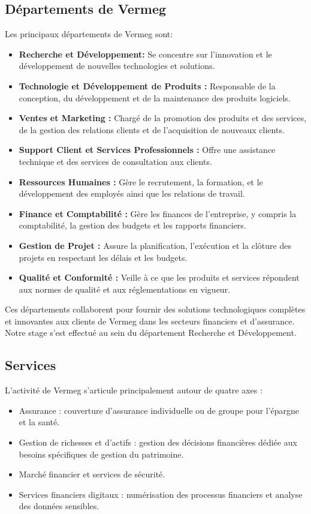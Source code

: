 \subsection{Départements de Vermeg }
Les principaux départements  de Vermeg sont: \cite[]{vermeg}
\begin{itemize}
    \item \textbf{Recherche et Développement:} Se concentre sur l'innovation et le développement de nouvelles technologies et solutions.
    \item \textbf{Technologie et Développement de Produits :} Responsable de la conception, du  développement et de la maintenance des produits logiciels.
    \item \textbf{Ventes et Marketing :} Chargé de la promotion des produits et des services, de la gestion des relations clients et de l'acquisition de nouveaux clients.
    \item \textbf{Support Client et Services Professionnels :} Offre une assistance technique et des services de consultation aux clients.
    \item \textbf{Ressources Humaines :} Gère le recrutement, la formation, et le développement des employés ainsi que les relations de travail.
    \item \textbf{Finance et Comptabilité :} Gère les finances de l'entreprise, y compris la comptabilité, la gestion des budgets et les rapports financiers.
    \item \textbf{Gestion de Projet :} Assure la planification, l'exécution et la clôture des projets en respectant les délais et les budgets.
    \item \textbf{Qualité et Conformité :} Veille à ce que les produits et services répondent aux normes de qualité et aux réglementations en vigueur.
\end{itemize} 
Ces départements collaborent pour fournir des solutions technologiques complètes et innovantes aux clients de Vermeg dans les secteurs financiers et d'assurance. \\ 
Notre stage s'est effectué au sein du département Recherche et Développement.
\subsection{Services }
     L'activité de Vermeg s'articule principalement autour de quatre axes : \cite[]{vermeg}
    \begin{itemize}
        \item Assurance : couverture d’assurance individuelle ou de groupe pour l’épargne et la santé.
        \item Gestion de richesses et d’actifs : gestion des décisions financières dédiée aux besoins spécifiques de gestion du patrimoine.
        \item Marché financier et services de sécurité.
        \item Services financiers digitaux : numérisation des processus financiers et analyse des données sensibles.
    \end{itemize} 
    \pagebreak


